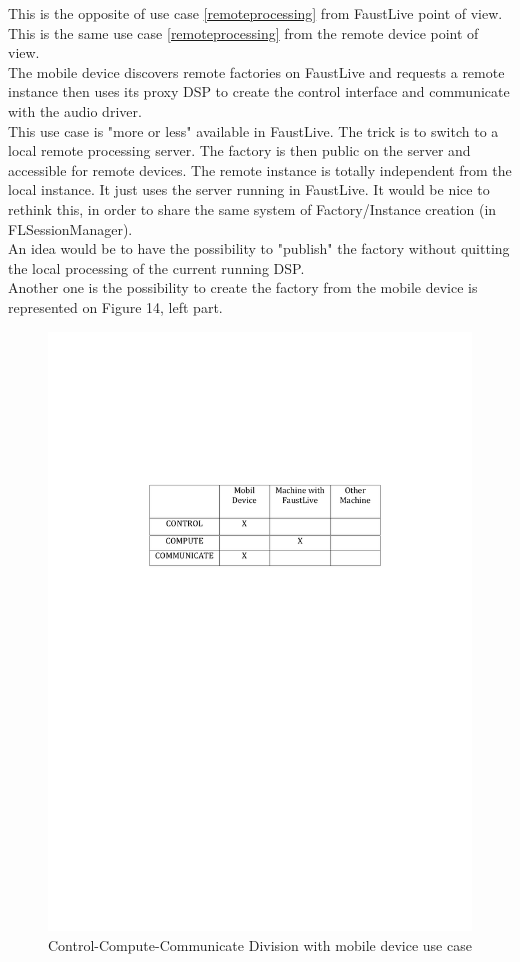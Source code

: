 \documentclass[a4paper]{article}
\begin{document}
This is the opposite of use case {\ref {remoteprocessing}} from FaustLive point of view. \\
This is the same use case {\ref {remoteprocessing}} from the remote device point of view. \\

The mobile device discovers remote factories on FaustLive and requests a remote instance then uses its proxy DSP to create the control interface and communicate with the audio driver. \\
This use case is "more or less" available in FaustLive. The trick is to switch to a local remote processing server. The factory is then public on the server and accessible for remote devices. The remote instance is totally independent from the local instance. It just uses the server running in FaustLive. It would be nice to rethink this, in order to share the same system of Factory/Instance creation (in FLSessionManager). \\

An idea would be to have the possibility to "publish" the factory without quitting the local processing of the current running DSP. \\
Another one is the possibility to create the factory from the mobile device is represented on Figure 14, left part.

\begin{figure}[!h]
\begin{center}
\includegraphics[width=0.7\columnwidth]{images/6CCC}
\caption{Control-Compute-Communicate Division with mobile device use case}
\label{fig:6CCC}
\end{center}
\end{figure}
\end{document}
